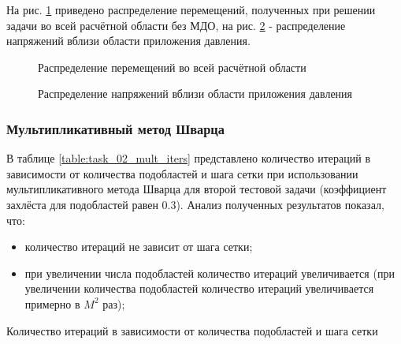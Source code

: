 \documentclass[a4paper]{article}
\begin{document}
\newpage

На рис. \ref{fig:task_02_basic_displacement_distribution} приведено распределение перемещений, полученных при решении задачи во всей расчётной области без МДО, на рис. \ref{fig:task_02_basic_pressure_distribution} - распределение напряжений вблизи области приложения давления.

\begin{figure}[h]
\caption{Распределение перемещений во всей расчётной области}
\label{fig:task_02_basic_displacement_distribution}
\end{figure}

\begin{figure}[h]
\caption{Распределение напряжений вблизи области приложения давления}
\label{fig:task_02_basic_pressure_distribution}
\end{figure}

\newpage

\subsubsection{Мультипликативный метод Шварца}

В таблице \ref{table:task_02_mult_iters} представлено количество итераций в зависимости от количества подобластей и шага сетки при использовании мультипликативного метода Шварца для второй тестовой задачи (коэффициент захлёста для подобластей равен 0.3). Анализ полученных результатов показал, что:
\begin{itemize}
\item количество итераций не зависит от шага сетки;
\item при увеличении числа подобластей количество итераций увеличивается (при увеличении количества подобластей количество итераций увеличивается примерно в $M^2$ раз);
\end{itemize}

\begin{table}[h]
\caption{Количество итераций в зависимости от количества подобластей и шага сетки}
\label{table:task_02_mult_iters}
\end{table}
\end{document}
